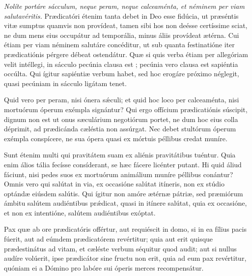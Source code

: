 {\noindent \emph{Nolíte portáre sácculum, neque peram, neque calceaménta, et néminem per viam salutavéritis.} Prædicatóri étenim tanta debet in Deo esse fidúcia, ut præséntis vitæ sumptus quamvis non provídeat, tamen sibi hos non deésse certíssime sciat, ne dum mens eius occupátur ad temporália, minus áliis provídeat ætérna. Cui étiam per viam néminem salutáre concéditur, ut sub quanta festinatióne iter prædicatiónis pérgere débeat ostendátur. Quæ si quis verba étiam per allegóriam velit intéllegi, in sácculo pecúnia clausa est ; pecúnia vero clausa est sapiéntia occúlta. Qui ígitur sapiéntiæ verbum habet, sed hoc erogáre próximo néglegit, quasi pecúniam in sácculo ligátam tenet.

\noindent Quid vero per peram, nisi ónera sǽculi; et quid hoc loco per calceaménta, nisi mortuórum óperum exémpla signántur? Qui ergo offícium prædicatiónis súscipit, dignum non est ut onus sæculárium negotiórum portet, ne dum hoc eius colla déprimit, ad prædicánda cæléstia non assúrgat. Nec debet stultórum óperum exémpla conspícere, ne sua ópera quasi ex mórtuis péllibus credat muníre.

\noindent Sunt étenim multi qui pravitátem suam ex aliénis pravitátibus tuéntur. Quia enim álios tália fecísse consíderant, se hæc fácere licénter putant. Hi quid áliud fáciunt, nisi pedes suos ex mortuórum animálium muníre péllibus conántur? Omnis vero qui salútat in via, ex occasióne salútat itíneris, non ex stúdio optándæ eiúsdem salútis. Qui ígitur non amóre ætérnæ pátriæ, sed præmiórum ámbitu salútem audiéntibus prǽdicat, quasi in itínere salútat, quia ex occasióne, et non ex intentióne, salútem audiéntibus exóptat.

\noindent Pax quæ ab ore prædicatóris offértur, aut requiéscit in domo, si in ea fílius pacis fúerit, aut ad eúmdem prædicatórem revértitur; quia aut erit quisque prædestinátus ad vitam, et cæléste verbum séquitur quod audit; aut si nullus audíre volúerit, ipse prædicátor sine fructu non erit, quia ad eum pax revértitur, quóniam ei a Dómino pro labóre sui óperis merces recompensátur.

\vfill
\pagebreak

 

\vspace{-5mm}

\vfill
\pagebreak
}
\newcommand{\benedictus}{\pars{Canticum Zachariæ.}  \scriptura{Mt. 13, 54-55}

\vspace{-4mm}

\antiphona{VIII G}{temporalia/ant-etdicebantunde.gtex}

\vspace{-2mm}

\scriptura{Lc. 1, 68-79}

\vspace{-2mm}

\cantusSineNeumas
\initiumpsalmi{temporalia/benedictus-initium-viiisoll-G-auto.gtex}


 \Abardot{}}


